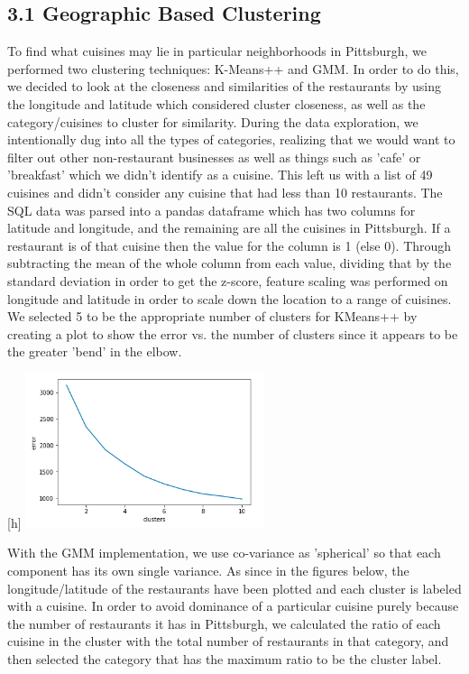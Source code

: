 \documentclass{neu_handout}
\begin{document}
\subsection*{3.1 Geographic Based Clustering}
To find what cuisines may lie in particular neighborhoods in Pittsburgh, we performed two clustering techniques: K-Means++ and GMM. In order to do this, we decided to look at the closeness and similarities of the restaurants by using the longitude and latitude which considered cluster closeness, as well as the category/cuisines to cluster for similarity. During the data exploration, we intentionally dug into all the types of categories, realizing that we would want to filter out other non-restaurant businesses as well as things such as 'cafe' or 'breakfast' which we didn't identify as a cuisine. This left us with a list of 49 cuisines and didn't consider any cuisine that had less than 10 restaurants. The SQL data was parsed into a pandas dataframe which has two columns for latitude and longitude, and the remaining are all the cuisines in Pittsburgh. If a restaurant is of that cuisine then the value for the column is 1 (else 0). Through subtracting the mean of the whole column from each value, dividing that by the standard deviation in order to get the z-score, feature scaling was performed on longitude and latitude in order to scale down the location to a range of cuisines. We selected 5 to be the appropriate number of clusters for KMeans++ by creating a plot to show the error vs. the number of clusters since it appears to be the greater 'bend' in the elbow. 

\begin{center}[h]
\includegraphics[width=70mm,scale=0.5]{kmeanserror}
\end{center}

With the GMM implementation, we use co-variance as 'spherical' so that each component has its own single variance. As since in the figures below, the longitude/latitude of the restaurants have been plotted and each cluster is labeled with a cuisine. In order to avoid dominance of a particular cuisine purely because the number of restaurants it has in Pittsburgh, we calculated the ratio of each cuisine in the cluster with the total number of restaurants in that category, and then selected the category that has the maximum ratio to be the cluster label.
\end{document}
